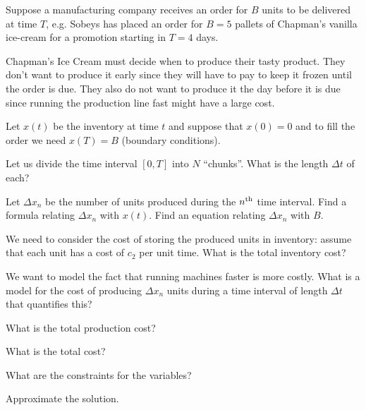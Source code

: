 \begin{slide}

\question

\begin{problem}

Suppose a manufacturing company receives an order for $B$ units to be delivered at time $T$, e.g. Sobeys has placed an order for $B = 5$ pallets of Chapman's vanilla ice-cream for a promotion starting in $T = 4$ days.

Chapman's Ice Cream must decide when to produce their tasty product. They don't want to produce it early since they will have to pay to keep it frozen until the order is due. They also do not want to produce it the day before it is due since running the production line fast might have a large cost. %
\end{problem}

Let $x(t)$ be the inventory at time $t$ and suppose that $x(0)=0$ and to fill the order we need $x(T)=B$ (boundary conditions).

\begin{parts}
	\item Let us divide the time interval $[0,T]$ into $N$ ``chunks''. What is the length $\Delta t$ of each?
	\item Let $\Delta x_n$ be the number of units produced during the $n^{\rm th}$ time interval. Find a formula relating $\Delta x_n$ with $x(t)$. Find an equation relating $\Delta x_n$ with $B$.
	\item We need to consider the cost of storing the produced units in inventory: assume that each unit has a cost of $c_2$ per unit time. What is the total inventory cost?
	\item We want to model the fact that running machines faster is more costly. What is a model for the cost of producing $\Delta x_n$ units during a time interval of length $\Delta t$ that quantifies this?
	\item What is the total production cost? 
	\item What is the total cost?
	\item What are the constraints for the variables?
	\item Approximate the solution.
\end{parts}
\end{slide}


